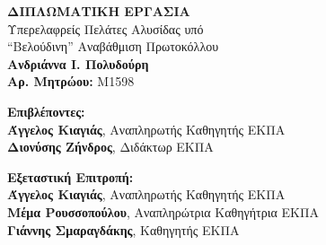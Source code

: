 \begin{center}
\begin{normalsize}
    \vspace{3cm}
    \textbf{ΔΙΠΛΩΜΑΤΙΚH ΕΡΓΑΣIΑ}\\
    \vspace{3cm}
    Υπερελαφρείς Πελάτες Αλυσίδας υπό \\
    ``Βελούδινη'' Αναβάθμιση Πρωτοκόλλου\\
    \vspace{3cm}
    \textbf{Ανδριάννα I. Πολυδούρη}\\
    \textbf{Αρ. Μητρώου:} M1598
 
    \begin{flushleft}
        \textbf{Επιβλέποντες:}\\ 
        \hspace{2cm}
        \textbf{Άγγελος Κιαγιάς}, Αναπληρωτής Καθηγητής ΕΚΠΑ\\
        \hspace{2cm}
        \textbf{Διονύσης Ζήνδρος}, Διδάκτωρ ΕΚΠΑ

        \textbf{Εξεταστική Επιτροπή:}\\ 
        \hspace{2cm}
        \textbf{Άγγελος Κιαγιάς}, Αναπληρωτής Καθηγητής ΕΚΠΑ\\
        \hspace{2cm}
        \textbf{Μέμα Ρουσσοπούλου}, Αναπληρώτρια Καθηγήτρια ΕΚΠΑ\\
        \hspace{2cm}
        \textbf{Γιάννης Σμαραγδάκης}, Καθηγητής ΕΚΠΑ

    \end{flushleft}

\end{normalsize}
\end{center}


\pagebreak